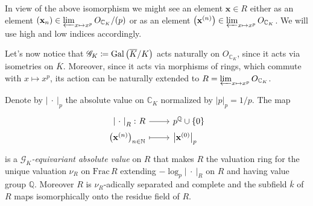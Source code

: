 \begin{ntt}[]\label{not:tiltingElts}
	In view of the above isomorphism we might see an element $\mathbf{x} \in R$
	either as an element 
	$\left( \mathbf{x}_n \right) \in \varprojlim_{x \mapsto x^p} O_{\mathbb{C}_K}/ (p)$
	or as an element
	$\left( \mathbf{x}^{(n)} \right) \in \varprojlim_{x \mapsto x^p} O_{\mathbb{C}_K}$.
	We will use high and low indices accordingly.
\end{ntt}


\begin{rem}[]\label{rem:GKActionR}
	Let's now notice that $\mathscr{G}_K \coloneqq \operatorname{Gal}\left( \overline{K} / K \right)$
	acts naturally on $O_{\mathbb{C}_K}$, since it acts via isometries on
	$\overline{K}$.
	Moreover, since it acts via morphisms of rings, which commute with $x \mapsto x^p$,
	its action can be naturally extended to
	$R = \varprojlim_{x \mapsto x^p} O_{\mathbb{C}_K}$.
\end{rem}


\begin{lem}
	Denote by $\left| \ \cdot \ \right|_p$ the absolute value on $\mathbb{C}_K$
	normalized by $\left| p \right|_p = 1/p$.
	The map
	\begin{equation*}
	\begin{tikzcd}[row sep = 0ex
		,/tikz/column 1/.append style={anchor=base east}
		,/tikz/column 2/.append style={anchor=base west}]
		\left| \ \cdot \ \right|_R\colon R \arrow[r, "", rightarrow] &
		p^{\mathbb{Q}} \cup \left\{ 0 \right\} \\
		\left( \mathbf{x}^{(n)} \right)_{n \in \mathbb{N}} \arrow[r, "", mapsto] & 
		\left| \mathbf{x}^{(0)} \right|_p
	\end{tikzcd}
	\end{equation*} 
	is a \emph{$\mathscr{G}_K$-equivariant absolute value} on $R$ that makes
	$R$ the valuation ring for the unique valuation
	$\nu_R$ on $\mathrm{Frac}\, R$ extending
	$-\log_p \left| \ \cdot \ \right|_R$ on $R$
	and having value group $\mathbb{Q}$.
	Moreover $R$ is $\nu_R$-adically separated and complete
	and the subfield $\overline{k}$ of $R$ maps
	isomorphically onto the residue field of $R$.
\end{lem} 


